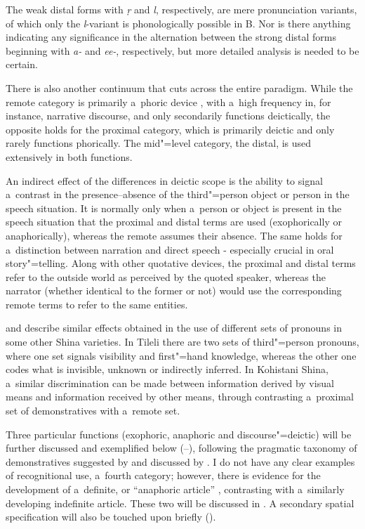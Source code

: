 The weak distal forms with \textit{ṛ} and \textit{l}, respectively, are mere pronunciation variants, of which only the \textit{l}-variant is phonologically possible in B. Nor is there anything indicating any significance in the alternation between the strong distal forms beginning with \textit{a-} and \textit{ee-}, respectively, but more detailed analysis is needed to be certain.



There is also another continuum that cuts across the entire paradigm. While the remote category is primarily a~phoric device \citep[131]{saxena2006}, with a~high frequency in, for instance, narrative discourse, and only secondarily functions deictically, the opposite holds for the proximal category, which is primarily deictic and only rarely functions phorically. The mid"=level category, the distal, is used extensively in both functions. 



An indirect effect of the differences in deictic scope is the ability to signal a~contrast in the presence--absence of the third"=person object or person in the speech situation. It is normally only when a~person or object is present in the speech situation that the proximal and distal terms are used (exophorically or anaphorically), whereas the remote assumes their absence. The same holds for a~distinction between narration and direct speech - especially crucial in oral story"=telling. Along with other quotative devices, the proximal and distal terms refer to the outside world as perceived by the quoted speaker, whereas the narrator (whether identical to the former or not) would use the corresponding remote terms to refer to the same entities.



\citet[204--205, 207--212]{schmidt2000} and \citet[134--136]{schmidtkohistani2001} describe similar effects obtained in the use of different sets of pronouns in some other Shina varieties. In Tileli there are two sets of third"=person pronouns, where one set signals visibility and first"=hand knowledge, whereas the other one codes what is invisible, unknown or indirectly inferred. In Kohistani Shina, a~similar discrimination can be made between information derived by visual means and information received by other means, through contrasting a~proximal set of demonstratives with a~remote set. 



Three particular functions (exophoric, anaphoric and discourse"=deictic) will be further discussed and exemplified below (--), following the pragmatic taxonomy of demonstratives suggested by \citet[205--254]{himmelmann1996} and discussed by \citet[432]{diessel2006}. I do not have any clear examples of recognitional use, a~fourth category; however, there is evidence for the development of a~definite, or ``anaphoric article'' \citep[486]{juvonen2006}, contrasting with a~similarly developing indefinite article. These two will be discussed in . A secondary spatial specification will also be touched upon briefly ().



